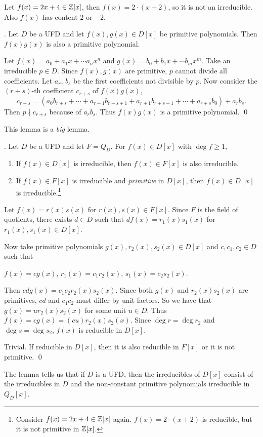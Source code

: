 Let \(f(x) = 2x + 4 \in \mathbb{Z}[x]\), then \(f(x) = 2 \cdot (x + 2)\), so it is not an irreducible. Also \(f(x)\) has content \(2\) or \(-2\).

\lemma.  Let \(D\) be a UFD and let \(f(x), g(x) \in D[x]\) be primitive polynomials. Then \(f(x)g(x)\) is also a primitive polynomial.

\pf Let \(f(x) = a_0 + a_1x + \cdots a_nx^n\) and \(g(x) = b_0 + b_1x + \cdots b_mx^m\). Take an irreducible \(p \in D\). Since \(f(x), g(x)\) are primitive, \(p\) cannot divide all coefficients. Let \(a_r\), \(b_s\) be the first coefficients not divisible by \(p\). Now consider the \((r+s)\)-th coefficient \(c_{r+s}\) of \(f(x)g(x)\),
\[
    c_{r+s} = (a_0b_{r+s} + \cdots + a_{r-1}b_{r+s+1} + a_{r+1}b_{r+s-1} + \cdots + a_{r+s}b_0) + a_rb_s.
\]
Then \(p \nmid c_{r+s}\) because of \(a_r b_s\). Thus \(f(x)g(x)\) is a primitive polynomial. \qed

This lemma is a \textit{big} lemma.

\lemma. Let \(D\) be a UFD and let \(F = Q_D\). For \(f(x) \in D[x]\) with \(\deg f \geq 1\),
\begin{enumerate}
    \item If \(f(x) \in D[x]\) is irreducible, then \(f(x) \in F[x]\) is also irreducible.
    \item If \(f(x) \in F[x]\) is irreducible and \textit{primitive} in \(D[x]\), then \(f(x) \in D[x]\) is irreducible.\footnote{Consider \(f(x) = 2x + 4 \in \mathbb{Z}[x]\) again. \(f(x) = 2 \cdot (x + 2)\) is reducible, but it is not primitive in \(\mathbb{Z}[x]\).}
\end{enumerate}

\pf {} Let \(f(x) = r(x)s(x)\) for \(r(x), s(x) \in F[x]\). Since \(F\) is the field of quotients, there exists \(d \in D\) such that \(df(x) = r_1(x)s_1(x)\) for \(r_1(x), s_1(x) \in D[x]\).

Now take primitive polynomials \(g(x), r_2(x), s_2(x) \in D[x]\) and \(c, c_1, c_2 \in D\) such that
\begin{center}
    \(f(x) = cg(x)\), \quad \(r_1(x) = c_1r_2(x)\), \quad \(s_1(x) = c_2 s_2(x)\).
\end{center}
Then \(cd g(x) = c_1c_2 r_2(x)s_2(x)\). Since both \(g(x)\) and \(r_2(x)s_2(x)\) are primitives, \(cd\) and \(c_1c_2\) must differ by unit factors. So we have that \(g(x) = u r_2(x)s_2(x)\) for some unit \(u \in D\). Thus \(f(x) = cg(x) = (cu) r_2(x) s_2(x)\). Since \(\deg r = \deg r_2\) and \(\deg s = \deg s_2\), \(f(x)\) is reducible in \(D[x]\).

 Trivial. If reducible in \(D[x]\), then it is also reducible in \(F[x]\) or it is not primitive. \qed

The lemma tells us that if \(D\) is a UFD, then the irreducibles of \(D[x]\) consist of the irreducibles in \(D\) and the non-constant primitive polynomials irreducible in \(Q_D[x]\).

\medskip
